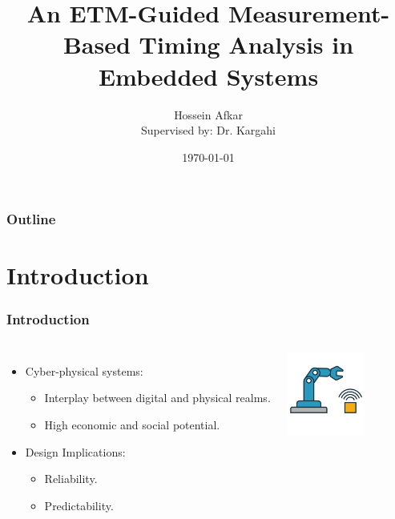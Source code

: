 \documentclass{beamer}
\title[ETM-Guided MBTA]
{An ETM-Guided Measurement-Based Timing Analysis in
Embedded Systems}
\author[Hossein Afkar]{Hossein Afkar \\ \footnotesize Supervised by: Dr. Kargahi}
\institute{University Of Tehran}
\date{\today}
\begin{document}

\frame{\titlepage}

\begin{frame}
    \frametitle{Outline}
    \tableofcontents[hideallsubsections]
\end{frame}

\section{Introduction}
\begin{frame}
    \frametitle{Introduction}
    \begin{columns}[c]
        \column{3.5in}
        \begin{itemize}
            \item Cyber-physical systems:
                \begin{itemize}
                    \item Interplay between digital and physical realms.
                        \nocite{lee2008cyber}
                    \item High economic and social potential.
                \end{itemize}
            \item Design Implications:
                \begin{itemize}
                    \item Reliability.
                    \item Predictability.
                \end{itemize}
        \end{itemize}
        \column{1.5in}
        \includegraphics[width=1in]{cps.jpg}
    \end{columns}
\end{frame}
\end{document}
